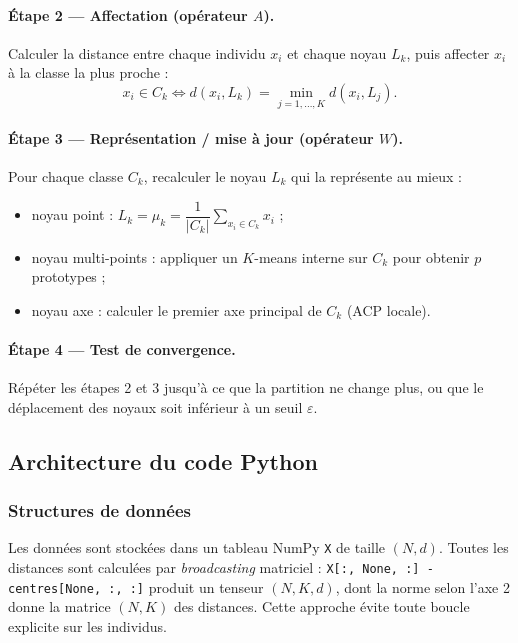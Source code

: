 \documentclass[a4paper, 11pt]{article}
\begin{document}
	\paragraph{Étape 2 --- Affectation (opérateur \(A\)).}
	Calculer la distance entre chaque individu \(x_i\) et chaque noyau
	\(L_k\), puis affecter \(x_i\) à la classe la plus proche :
	\[
	x_i \in C_k \iff d(x_i, L_k) = \min_{j=1,\dots,K} d(x_i, L_j).
	\]
	
	\paragraph{Étape 3 --- Représentation / mise à jour (opérateur \(W\)).}
	Pour chaque classe \(C_k\), recalculer le noyau \(L_k\) qui la
	représente au mieux :
	\begin{itemize}
		\item noyau point :
		\(L_k = \mu_k = \dfrac{1}{|C_k|} \sum_{x_i \in C_k} x_i\) ;
		\item noyau multi-points : appliquer un \(K\)-means interne sur
		\(C_k\) pour obtenir \(p\) prototypes ;
		\item noyau axe : calculer le premier axe principal de \(C_k\)
		(ACP locale).
	\end{itemize}
	
	\paragraph{Étape 4 --- Test de convergence.}
	Répéter les étapes 2 et 3 jusqu'à ce que la partition ne change plus,
	ou que le déplacement des noyaux soit inférieur à un seuil
	\(\varepsilon\).
	
	\subsection{Architecture du code Python}
	
	\subsubsection*{Structures de données}
	
	Les données sont stockées dans un tableau NumPy
	\texttt{X} de taille \((N, d)\). Toutes les distances sont calculées
	par \emph{broadcasting} matriciel :
	\texttt{X[:, None, :] - centres[None, :, :]} produit un tenseur
	\((N, K, d)\), dont la norme selon l'axe 2 donne la matrice
	\((N, K)\) des distances. Cette approche évite toute boucle explicite
	sur les individus.
	
\end{document}
